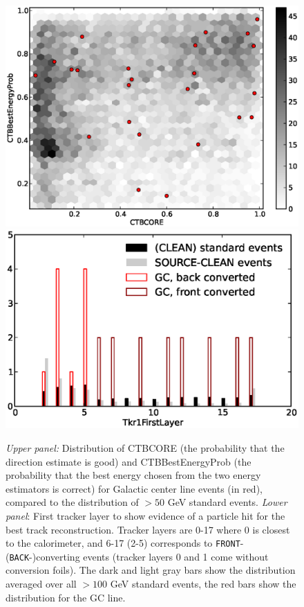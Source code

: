\documentclass[aps,twocolumn,prd,superscriptaddress,showpacs,nofootinbib,fixfloat]{revtex4}
\begin{document}
\begin{figure}
  \centering
  \includegraphics[width=1.00\linewidth]{plots/CTBCORE_CTBBestEnergyProb.eps}
  \includegraphics[width=1.00\linewidth]{plots/Tkr1FirstLayer.eps}
  \caption{\emph{Upper panel:} Distribution of CTBCORE (the
  probability that the direction estimate is good) and
  CTBBestEnergyProb (the probability that the best energy
  chosen from the two energy estimators is correct) for
  Galactic center line events (in red), compared to the
  distribution of $>50$ GeV standard events.  \emph{Lower
  panel}: First tracker layer to show evidence of a particle
  hit for the best track reconstruction. Tracker layers are
  0-17 where 0 is closest to the calorimeter, and 6-17 (2-5)
  corresponds to \texttt{FRONT}- (\texttt{BACK}-)converting events (tracker
  layers 0 and 1 come without conversion foils). The dark and light gray
  bars show the distribution averaged over all $>100$ GeV
  standard events, the red bars show the distribution
  for the GC line.}
  \label{fig:CTBquality}
\end{figure}
\end{document}
